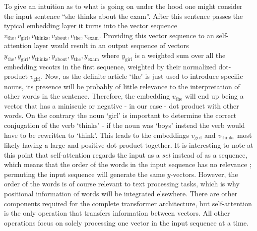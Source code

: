 To give an intuition as to what is going on under the hood one might consider the input sentence ``she thinks about the exam''. After this sentence passes the typical embedding layer it turns into the vector sequence $ v_{\text{the}}, v_{\text{girl}}, v_{\text{thinks}}, v_{\text{about}}, v_{\text{the}}, v_{\text{exam}} $. Providing this vector sequence to an self-attention layer would result in an output sequence of vectors $ y_{\text{the}}, y_{\text{girl}}, y_{\text{thinks}}, y_{\text{about}}, y_{\text{the}}, y_{\text{exam}} $ where $ y_{\text{girl}} $ is a weighted sum over all the embedding vecotrs in the first sequence, weighted by their normalized dot-product $ v_{\text{girl}} $. Now, as the definite article `the' is just used to introduce specific nouns, its presence will be probably of little relevance to the interpretation of other words in the sentence. Therefore, the embedding $ v_{\text{the}} $ will end up being a vector that has a miniscule or negative - in our case - dot product with other words. On the contrary the noun `girl' is important to determine the correct conjugation of the verb `thinks' - if the noun was `boys' instead the verb would have to be rewritten to `think'. This leads to the embeddings $ v_{\text{girl}} $ and $ v_{\text{thinks}} $ most likely having a large and positive dot product together. It is interesting to note at this point that self-attention regards the input as a \textit{set} instead of as a sequence, which means that the order of the words in the input sequence has no relevance ; permuting the input sequence will generate the same $ y $-vectors. However, the order of the words is of course relevant to text processing tasks, which is why positional information of words will be integrated elsewhere. There are other components required for the complete transformer architecture, but self-attention is the only operation that transfers information between vectors. All other operations focus on solely processing one vector in the input sequence at a time.

